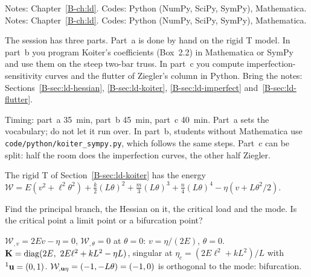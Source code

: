 \clearpage
\renewcommand{\sessionchapter}{Chapter 2 -- Discrete systems: energy and Lagrangian mechanics}
\setcounter{spart}{0}
\setcounter{algorithm}{0}
\ifanswers
{}
  {Notes: Chapter~\ref{B-ch:ld}. Codes: Python (NumPy, SciPy, SymPy), Mathematica.}
\else
{}
  {Notes: Chapter~\ref{B-ch:ld}. Codes: Python (NumPy, SciPy, SymPy), Mathematica.}
\fi

\noindent
The session has three parts. Part~a is done by hand on the rigid T model. In part~b
you program Koiter's coefficients (Box~2.2) in Mathematica or SymPy and use them on
the steep two-bar truss. In part~c you compute imperfection-sensitivity curves and the
flutter of Ziegler's column in Python. Bring the notes: Sections~\ref{B-sec:ld-hessian},
\ref{B-sec:ld-koiter}, \ref{B-sec:ld-imperfect} and~\ref{B-sec:ld-flutter}.

\begin{instructor}
Timing: part~a 35~min, part~b 45~min, part~c 40~min. Part~a sets the vocabulary; do
not let it run over. In part~b, students without Mathematica use
\texttt{code/python/koiter\_sympy.py}, which follows the same steps. Part~c can be
split: half the room does the imperfection curves, the other half Ziegler.
\end{instructor}

The rigid T of Section~\ref{B-sec:ld-koiter} has the energy
$\mathcal{W} = E(v^2 + \ell^2\theta^2) + \tfrac k2(L\theta)^2 + \tfrac m3(L\theta)^3
+ \tfrac n4(L\theta)^4 - \eta(v + L\theta^2/2)$.

\q Find the principal branch, the Hessian on it, the critical load and the mode.
Is the critical point a limit point or a bifurcation point?
\begin{answer}
$\mathcal{W}_{,v} = 2Ev - \eta = 0$, $\mathcal{W}_{,\theta} = 0$ at $\theta = 0$: $v = \eta/(2E)$,
$\theta = 0$. $\mathbf{K} = \operatorname{diag}(2E,\ 2E\ell^2 + kL^2 - \eta L)$, singular at
$\eta_c = (2E\ell^2 + kL^2)/L$ with ${}^1\mathbf{u} = (0,1)$.
$\mathcal{W}_{,\mathbf{u}\eta} = (-1, -L\theta) = (-1,0)$ is orthogonal to the mode: bifurcation.
\end{answer}

